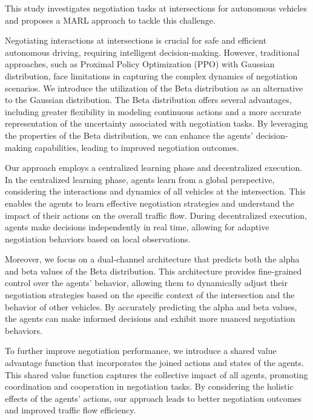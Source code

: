\begin{e-abstract}
This study investigates negotiation tasks at intersections for autonomous vehicles and proposes a MARL approach to tackle this challenge.

Negotiating interactions at intersections is crucial for safe and efficient autonomous driving, requiring intelligent decision-making. However, traditional approaches, such as Proximal Policy Optimization (PPO) with Gaussian distribution, face limitations in capturing the complex dynamics of negotiation scenarios. We introduce the utilization of the Beta distribution as an alternative to the Gaussian distribution. The Beta distribution offers several advantages, including greater flexibility in modeling continuous actions and a more accurate representation of the uncertainty associated with negotiation tasks. By leveraging the properties of the Beta distribution, we can enhance the agents' decision-making capabilities, leading to improved negotiation outcomes.

Our approach employs a centralized learning phase and decentralized execution. In the centralized learning phase, agents learn from a global perspective, considering the interactions and dynamics of all vehicles at the intersection. This enables the agents to learn effective negotiation strategies and understand the impact of their actions on the overall traffic flow. During decentralized execution, agents make decisions independently in real time, allowing for adaptive negotiation behaviors based on local observations.

Moreover, we focus on a dual-channel architecture that predicts both the alpha and beta values of the Beta distribution. This architecture provides fine-grained control over the agents' behavior, allowing them to dynamically adjust their negotiation strategies based on the specific context of the intersection and the behavior of other vehicles. By accurately predicting the alpha and beta values, the agents can make informed decisions and exhibit more nuanced negotiation behaviors.

To further improve negotiation performance, we introduce a shared value advantage function that incorporates the joined actions and states of the agents. This shared value function captures the collective impact of all agents, promoting coordination and cooperation in negotiation tasks. By considering the holistic effects of the agents' actions, our approach leads to better negotiation outcomes and improved traffic flow efficiency.


\end{e-abstract}
